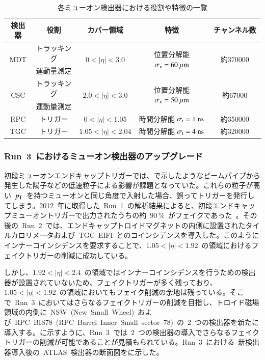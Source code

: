 \begin{table}[tb]
	\centering
	\begin{tabular}{c|cccc}\hline
	    検出器 & 役割 & カバー領域 & 特徴 & チャンネル数　\\ \hline\hline
		\multirow{2}{*}{MDT} & トラッキング & \multirow{2}{*}{$0<|\eta|<3.0$} &\multirow{2}{*}{位置分解能 $\sigma_{\rm{x}}=60~ \mu \rm{m}$} & \multirow{2}{*}{約370000} \\ 
		& 運動量測定 & & & \\ \hline
		\multirow{2}{*}{CSC} & トラッキング & \multirow{2}{*}{$2.0<|\eta|<3.0$} &\multirow{2}{*}{位置分解能 $\sigma_{\rm{x}}=50~ \mu \rm{m}$} & \multirow{2}{*}{約67000} \\ 
		& 運動量測定 & & & \\ \hline
        \multirow{2}{*}{RPC} & \multirow{2}{*}{トリガー} & \multirow{2}{*}{$0<|\eta|<1.05$} &\multirow{2}{*}{時間分解能 $\sigma_{\rm{t}}=1~\rm{ns}$} & \multirow{2}{*}{約350000} \\ 
		&  & & & \\ \hline
        \multirow{2}{*}{TGC} & \multirow{2}{*}{トリガー} & \multirow{2}{*}{$1.05<|\eta|<2.04$} &\multirow{2}{*}{時間分解能 $\sigma_{\rm{t}}=4~\rm{ns}$} & \multirow{2}{*}{約320000} \\ 
		&  &  & \\ 
	\end{tabular}
	\caption{各ミューオン検出器における役割や特徴の一覧}
    \label{tb:muon}
\end{table}

\subsubsection{Run~3~におけるミューオン検出器のアップグレード}
初段ミューオンエンドキャップトリガーでは、で示したようなビームパイプから発生した陽子などの低速粒子による影響が課題となっていた。これらの粒子が高い~$p_{\rm{T}}$~を持つミューオンと同じ角度で入射した場合、誤ってトリガーを発行してしまう。2012~年に取得した~Run~1~の解析結果によると、初段エンドキャップミューオントリガーで出力されたうちの約~$90~\%$~がフェイクであった~\cite{TR:05}。その後の~Run~2~では、エンドキャップトロイドマグネットの内側に設置されたタイルカロリメータおよび~TGC~EIFI~とのコインシデンスを導入した。このようにインナーコインシデンスを要求することで、$1.05<|\eta|<1.92$~の領域におけるフェイクトリガーの削減に成功している。

しかし、$1.92<|\eta|<2.4$~の領域ではインナーコインシデンスを行うための検出器が設置されていないため、フェイクトリガーが多く残っており、$1.05<|\eta|<1.92$~の領域においてもフェイク削減の余地は残っている。そこで~Run~3~においてはさらなるフェイクトリガーの削減を目指し、トロイド磁場領域の内側に~NSW~(New~Small~Wheel)~および~RPC~BIS78~(RPC~Barrel~Inner~Small~sector~78)~の~2~つの検出器を新たに導入する。に示すように、Run~3~では~2~つの検出器の導入でさらなるフェイクトリガーの削減が可能であることが見積もられている。Run~3~における~新検出器導入後の~ATLAS~検出器の断面図をに示した。

